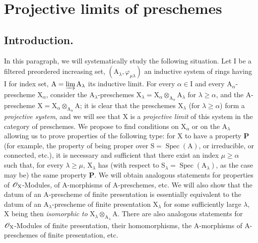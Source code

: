 \section{Projective limits of preschemes}
\label{section:IV.8}

\subsection{Introduction.}
\label{subsection:IV.8.1}


\begin{env}[8.1.1]
\label{IV.8.1.1}
In this paragraph, we will systematically study the following situation.
Let $\mathrm{I}$ be a filtered preordered increasing set, $(\mathrm{A}_\lambda,\varphi_{\mu\lambda})$ an inductive system of rings having $\mathrm{I}$ for index set, $\mathrm{A}=\varinjlim\mathrm{A}_\lambda$ its inductive limit.
For every $\alpha\in\mathrm{I}$ and every $\mathrm{A}_\alpha$-prescheme $\mathrm{X}_\alpha$, consider the $\mathrm{A}_\lambda$-preschemes $\mathrm{X}_\lambda=\mathrm{X}_\alpha\otimes_{\mathrm{A}_\alpha}\mathrm{A}_\lambda$ for $\lambda\geqslant\alpha$, and the $\mathrm{A}$-prescheme $\mathrm{X}=\mathrm{X}_\alpha\otimes_{\mathrm{A}_\alpha}\mathrm{A}$; it is clear that the preschemes $\mathrm{X}_\lambda$ (for $\lambda\geqslant\alpha$) form a \emph{projective system}, and we will see  that $\mathrm{X}$ is a \emph{projective limit} of this system in the category of preschemes.
We propose to find conditions on $\mathrm{X}_\alpha$ or on the $\mathrm{A}_\lambda$ allowing us to prove properties of the following type:
for $\mathrm{X}$ to have a property $\boldsymbol{P}$ (for example, the property of being proper over $\mathrm{S}=\operatorname{Spec}(\mathrm{A})$, or irreducible, or connected, etc.), it is necessary and sufficient that there exist an index $\mu\geqslant\alpha$ such that, for every $\lambda\geqslant\mu$, $\mathrm{X}_\lambda$ has (with respect to $\mathrm{S}_\lambda=\operatorname{Spec}(\mathrm{A}_\lambda)$, as the case may be) the same property $\boldsymbol{P}$.
We will obtain analogous statements for properties of $\mathscr{O}_\mathrm{X}$-Modules, of $\mathrm{A}$-morphisms of $\mathrm{A}$-preschemes, etc.
We will also show  that the datum of an $\mathrm{A}$-prescheme of finite presentation  is essentially equivalent to the datum of an $\mathrm{A}_\lambda$-prescheme of finite presentation $\mathrm{X}_\lambda$ for some sufficiently large $\lambda$, $\mathrm{X}$ being then \emph{isomorphic to} $\mathrm{X}_\lambda\otimes_{\mathrm{A}_\lambda}\mathrm{A}$.
There are also analogous statements for $\mathscr{O}_\mathrm{X}$-Modules of finite presentation, their homomorphisms, the $\mathrm{A}$-morphisms of $\mathrm{A}$-preschemes of finite presentation, etc.
\end{env}

